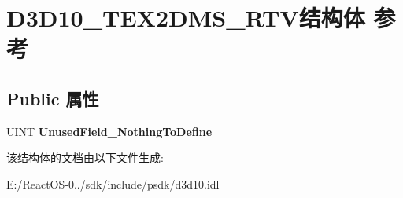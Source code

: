 \hypertarget{struct_d3_d10___t_e_x2_d_m_s___r_t_v}{}\section{D3\+D10\+\_\+\+T\+E\+X2\+D\+M\+S\+\_\+\+R\+T\+V结构体 参考}
\label{struct_d3_d10___t_e_x2_d_m_s___r_t_v}
\subsection*{Public 属性}
\begin{DoxyCompactItemize}
\item 
\mbox{\label{struct_d3_d10___t_e_x2_d_m_s___r_t_v_acd402894b8e91a1b84099f63d5de2396}} 
U\+I\+NT {\bfseries Unused\+Field\+\_\+\+Nothing\+To\+Define}
\end{DoxyCompactItemize}


该结构体的文档由以下文件生成\+:\begin{DoxyCompactItemize}
\item 
E\+:/\+React\+O\+S-\/0../sdk/include/psdk/d3d10.\+idl\end{DoxyCompactItemize}
